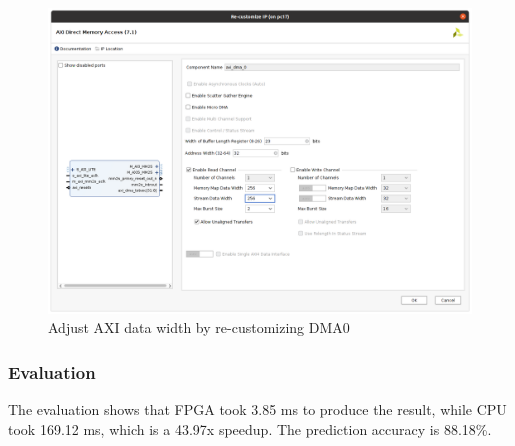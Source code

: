 \begin{figure}[ht!]
    \centering
    \caption{Adjust AXI data width by re-customizing DMA0}
    \label{fig:adjust-axi-data-width}
    \includegraphics[scale=0.32]{images/adjust-axi-data-width.png}
\end{figure}

\subsubsection{Evaluation}

The evaluation shows that FPGA took 3.85 ms to produce the result, while CPU took 169.12 ms,
which is a 43.97x speedup.
The prediction accuracy is 88.18\%.



